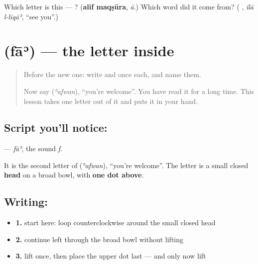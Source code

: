 \begin{tcolorbox}[breakable,colback=teal!4,colframe=teal!35!black,title={Before you move on}]
Which letter is this — ? (\textbf{alif maqṣūra}, \emph{ā}.) Which word did it come from? (\textbf{ }, \emph{ilā l-liqāʾ}, \textquotedblleft{}see you\textquotedblright{}.)
\end{tcolorbox}
\section[\texorpdfstring{\ar{ف} (fāʾ)}{ف (fāʾ)}]{ (fāʾ) — the letter inside }

\label{lesson:AR-W47-fa}



\begin{quote}
Before the new one: write  and  once each, and name them.

Now say \textbf{} (\emph{ʿafwan}), \textquotedblleft{}you're welcome\textquotedblright{}. You have read it for a long time. This lesson takes one letter out of it and puts it in your hand.
\end{quote}

\subsection*{Script you'll notice: }
\textbf{} — \emph{fāʾ}, the sound \emph{f}.

It is the second letter of \textbf{} (\emph{ʿafwan}), \textquotedblleft{}you're welcome\textquotedblright{}. The letter is a small closed \textbf{head} on a broad bowl, with \textbf{one dot above}.

\subsection*{Writing: }

\begin{itemize}
\raggedright
  \item \textbf{1.} start here: loop counterclockwise around the small closed head
  \item \textbf{2.} continue left through the broad bowl without lifting
  \item \textbf{3.} lift once, then place the upper dot last — and only now lift
\end{itemize}

